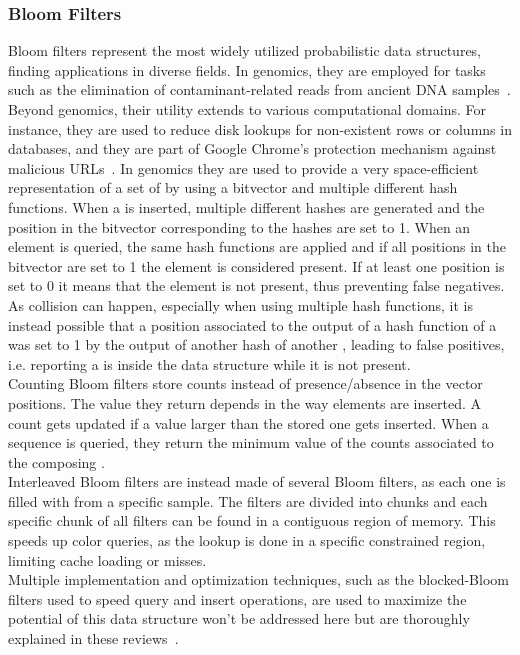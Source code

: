 \subsubsection{Bloom Filters}
\label{sec:bloom_filters}
Bloom filters represent the most widely utilized probabilistic data structures, finding applications in diverse fields. In genomics, they are employed for tasks such as the elimination of contaminant-related reads from ancient DNA samples~\cite{akmerbroom}. Beyond genomics, their utility extends to various computational domains. For instance, they are used to reduce disk lookups for non-existent rows or columns in databases, and they are part of Google Chrome's protection mechanism against malicious URLs~\cite{dbbf,chromebf}. In genomics they are used to provide a very space-efficient representation of a set of \kmers by using a bitvector and multiple different hash functions. When a \kmer is inserted, multiple different hashes are generated and the position in the bitvector corresponding to the hashes are set to 1. When an element is queried, the same hash functions are applied and if all positions in the bitvector are set to 1 the element is considered present. If at least one position is set to 0 it means that the element is not present, thus preventing false negatives. As collision can happen, especially when using multiple hash functions, it is instead possible that a position associated to the output of a hash function of a \kmer was set to 1 by the output of another hash of another \kmer, leading to false positives, i.e. reporting a \kmer is inside the data structure while it is not present.\\
Counting Bloom filters store counts instead of presence/absence in the vector positions. The value they return depends in the way elements are inserted. A \kmer count gets updated if a value larger than the stored one gets inserted. When a sequence is queried, they return the minimum value of the counts associated to the composing \kmers.\\
Interleaved Bloom filters are instead made of several Bloom filters, as each one is filled with \kmers from a specific sample. The filters are divided into chunks and each specific chunk of all filters can be found in a contiguous region of memory. This speeds up color queries, as the lookup is done in a specific constrained region, limiting cache loading or misses.\\
Multiple implementation and optimization techniques, such as the blocked-Bloom filters used to speed query and insert operations, are used to maximize the potential of this data structure won't be addressed here but are thoroughly explained in these reviews~\cite{marchet2024kmersets,marchet2021kmer,marchet2024coloredkmersets}. 

